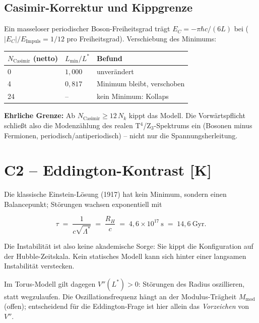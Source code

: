 \subsection{Casimir-Korrektur und Kippgrenze}

Ein masseloser periodischer Boson-Freiheitsgrad trägt
$E_C = -\pi\hbar c/(6L)$ bei ($|E_C|/E_\text{Impuls} = 1/12$ pro
Freiheitsgrad). Verschiebung des Minimums:

\begin{center}
\begin{tabular}{lll}
\toprule
$N_\text{Casimir}$ (netto) & $L_{\min}/L^{*}$ & Befund \\
\midrule
0  & $1{,}000$ & unverändert \\
4  & $0{,}817$ & Minimum bleibt, verschoben \\
24 & --        & kein Minimum: Kollaps \\
\bottomrule
\end{tabular}
\end{center}

\textbf{Ehrliche Grenze:} Ab $N_\text{Casimir} \ge 12\,N_k$ kippt
das Modell. Die Vorwärtspflicht schließt also die Modenzählung des
realen T$^4$/Z$_3$-Spektrums ein (Bosonen minus Fermionen,
periodisch/antiperiodisch) -- nicht nur die Spannungsherleitung.

\section{C2 -- Eddington-Kontrast [K]}

Die klassische Einstein-Lösung (1917) hat kein Minimum, sondern
einen Balancepunkt; Störungen wachsen exponentiell mit

\begin{equation}
  \tau \;=\; \frac{1}{c\sqrt{\Lambda^{*}}} \;=\; \frac{R_H}{c}
  \;=\; 4{,}6\times10^{17}~\text{s} \;=\; 14{,}6~\text{Gyr}.
\end{equation}

Die Instabilität ist also keine akademische Sorge: Sie kippt die
Konfiguration auf der Hubble-Zeitskala. Kein statisches Modell kann
sich hinter einer langsamen Instabilität verstecken.

Im Torus-Modell gilt dagegen $V''(L^{*}) > 0$: Störungen des Radius
oszillieren, statt wegzulaufen. Die Oszillationsfrequenz hängt an
der Modulus-Trägheit $M_\text{mod}$ (offen); entscheidend für die
Eddington-Frage ist hier allein das \emph{Vorzeichen} von $V''$.

